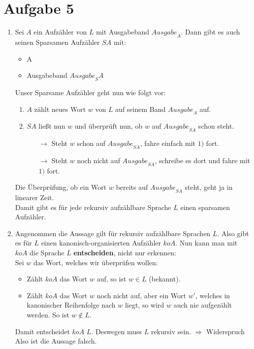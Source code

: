 \documentclass[a4paper,11pt]{scrartcl}
\begin{document}
	
	\section*{Aufgabe 5}
	\begin{enumerate}[label=(\alph*)]
	\item	Sei $A$ ein Aufzähler von $L$ mit Ausgabeband ${Ausgabe}_A$. Dann gibt es auch seinen Sparsamen Aufzähler $SA$ mit:
			\begin{itemize}
			\item A
			\item Ausgabeband ${Ausgabe}_SA$
			\end{itemize}
			Unser Sparsame Aufzähler geht nun wie folgt vor:
			\begin{enumerate}[label=\arabic*)]
			\item $A$ zählt neues Wort $w$ von $L$ auf seinem Band ${Ausgabe}_A$ auf.
			\item $SA$ ließt nun $w$ und überprüft nun, ob $w$ auf ${Ausgabe}_{SA}$ schon steht.
				\begin{itemize}
				\item[$\rightarrow$] Steht $w$ schon auf ${Ausgabe}_{SA}$, fahre einfach mit $1)$ fort.
				\item[$\rightarrow$] Steht $w$ noch nicht auf ${Ausgabe}_{SA}$, schreibe es dort und fahre mit $1)$ fort.
				\end{itemize}
			\end{enumerate}
			Die Überprüfung, ob ein Wort $w$ bereits auf ${Ausgabe}_{SA}$ steht, geht ja in linearer Zeit.\\
			Damit gibt es für jede rekursiv aufzählbare Sprache $L$ einen sparsamen Aufzähler.
	
	\item	Angenommen die Aussage gilt für rekursiv aufzählbare Sprachen $L$. Also gibt es für $L$ einen kanonisch-organisierten Aufzähler $koA$. Nun kann man mit $koA$ die Sprache $L$ \textbf{entscheiden}, nicht nur erkennen:\\
			Sei $w$ das Wort, welches wir überprüfen wollen:
			\begin{itemize}
			\item Zählt $koA$ das Wort $w$ auf, so ist $w \in L$ (bekannt).
			\item Zählt $koA$ das Wort $w$ noch nicht auf, aber ein Wort $w'$, welches in kanonischer Reihenfolge nach $w$ liegt, so wird $w$ auch nie aufgezählt werden. So ist $w \not\in L$.
			\end{itemize}
			Damit entscheidet $koA$ $L$. Deswegen muss $L$ rekursiv sein. $\Rightarrow$ Widerspruch \\
			Also ist die Aussage falsch.
	\end{enumerate}
	
\end{document}
